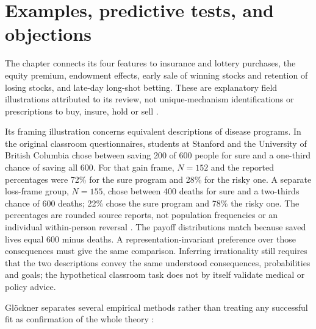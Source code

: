 \section{Examples, predictive tests, and objections}

The chapter connects its four features to insurance and lottery
purchases, the equity premium, endowment effects, early sale of winning
stocks and retention of losing stocks, and late-day long-shot betting.
These are explanatory field illustrations attributed to its review,
not unique-mechanism identifications or prescriptions to buy, insure,
hold or sell \cite[p.~486]{Glockner2021ProspectTheory}.

Its framing illustration concerns equivalent descriptions of disease
programs. In the original classroom questionnaires, students at
Stanford and the University of British Columbia chose between saving
200 of 600 people for sure and a one-third chance of saving all 600.
For that gain frame, \(N=152\) and the reported percentages were
72\% for the sure program and 28\% for the risky one. A separate
loss-frame group, \(N=155\), chose between 400 deaths for sure and
a two-thirds chance of 600 deaths; 22\% chose the sure program and
78\% the risky one. The percentages are rounded source reports,
not population frequencies or an individual within-person reversal
\cite[p.~453]{TverskyKahneman1981Framing}.
The payoff distributions match because saved lives equal 600 minus
deaths. A representation-invariant preference over those consequences
must give the same comparison. Inferring irrationality still requires
that the two descriptions convey the same understood consequences,
probabilities and goals; the hypothetical classroom task does not
by itself validate medical or policy advice.

Gl\"ockner separates several empirical methods rather than treating
any successful fit as confirmation of the whole theory
\cite[pp.~488--491]{Glockner2021ProspectTheory}:

